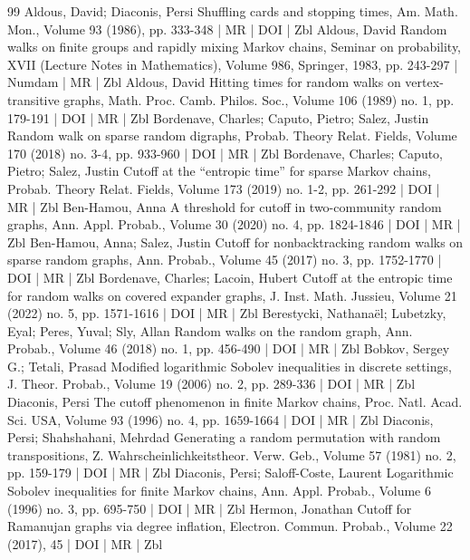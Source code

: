\documentclass[10pt]{amsart}
\theoremstyle{definition}\newtheorem{defi}[theo]{Definition}\newtheorem{rema}[theo]{Remark}\newtheorem{exam}[theo]{Example}\newtheorem{exem}[theo]{Example}\newtheorem{nota}[theo]{Notation}
\begin{document}
\begin{thebibliography}{99}
 Aldous, David; Diaconis, Persi Shuffling cards and stopping times, Am. Math. Mon., Volume 93 (1986), pp. 333-348 | MR | DOI | Zbl
 Aldous, David Random walks on finite groups and rapidly mixing Markov chains, Seminar on probability, XVII (Lecture Notes in Mathematics), Volume 986, Springer, 1983, pp. 243-297 | Numdam | MR | Zbl
 Aldous, David Hitting times for random walks on vertex-transitive graphs, Math. Proc. Camb. Philos. Soc., Volume 106 (1989) no. 1, pp. 179-191 | DOI | MR | Zbl
 Bordenave, Charles; Caputo, Pietro; Salez, Justin Random walk on sparse random digraphs, Probab. Theory Relat. Fields, Volume 170 (2018) no. 3-4, pp. 933-960 | DOI | MR | Zbl
 Bordenave, Charles; Caputo, Pietro; Salez, Justin Cutoff at the “entropic time” for sparse Markov chains, Probab. Theory Relat. Fields, Volume 173 (2019) no. 1-2, pp. 261-292 | DOI | MR | Zbl
 Ben-Hamou, Anna A threshold for cutoff in two-community random graphs, Ann. Appl. Probab., Volume 30 (2020) no. 4, pp. 1824-1846 | DOI | MR | Zbl
 Ben-Hamou, Anna; Salez, Justin Cutoff for nonbacktracking random walks on sparse random graphs, Ann. Probab., Volume 45 (2017) no. 3, pp. 1752-1770 | DOI | MR | Zbl
 Bordenave, Charles; Lacoin, Hubert Cutoff at the entropic time for random walks on covered expander graphs, J. Inst. Math. Jussieu, Volume 21 (2022) no. 5, pp. 1571-1616 | DOI | MR | Zbl
 Berestycki, Nathanaël; Lubetzky, Eyal; Peres, Yuval; Sly, Allan Random walks on the random graph, Ann. Probab., Volume 46 (2018) no. 1, pp. 456-490 | DOI | MR | Zbl
 Bobkov, Sergey G.; Tetali, Prasad Modified logarithmic Sobolev inequalities in discrete settings, J. Theor. Probab., Volume 19 (2006) no. 2, pp. 289-336 | DOI | MR | Zbl
 Diaconis, Persi The cutoff phenomenon in finite Markov chains, Proc. Natl. Acad. Sci. USA, Volume 93 (1996) no. 4, pp. 1659-1664 | DOI | MR | Zbl
 Diaconis, Persi; Shahshahani, Mehrdad Generating a random permutation with random transpositions, Z. Wahrscheinlichkeitstheor. Verw. Geb., Volume 57 (1981) no. 2, pp. 159-179 | DOI | MR | Zbl
 Diaconis, Persi; Saloff-Coste, Laurent Logarithmic Sobolev inequalities for finite Markov chains, Ann. Appl. Probab., Volume 6 (1996) no. 3, pp. 695-750 | DOI | MR | Zbl
 Hermon, Jonathan Cutoff for Ramanujan graphs via degree inflation, Electron. Commun. Probab., Volume 22 (2017), 45 | DOI | MR | Zbl

\end{thebibliography}
\end{document}
